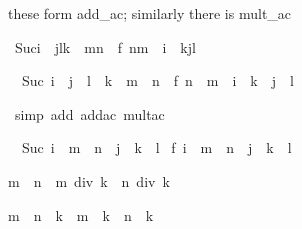 \begin{isabellebody}
\begin{isamarkuptext}
these form add_ac; similarly there is mult_ac%
\end{isamarkuptext}%
\isamarkuptrue%
\isamarkupfalse%
\ {\isachardoublequoteopen}Suc{\isacharparenleft}i\ {\isacharplus}\ j{\isacharasterisk}l{\isacharasterisk}k\ {\isacharplus}\ m{\isacharasterisk}n{\isacharparenright}\ {\isacharequal}\ f\ {\isacharparenleft}n{\isacharasterisk}m\ {\isacharplus}\ i\ {\isacharplus}\ k{\isacharasterisk}j{\isacharasterisk}l{\isacharparenright}{\isachardoublequoteclose}%
\isadelimproof
%
\endisadelimproof
%
\isatagproof
%
\begin{isamarkuptxt}%
\begin{isabelle}%
\ {}{\isachardot}\ Suc\ {\isacharparenleft}i\ {\isacharplus}\ j\ {\isacharasterisk}\ l\ {\isacharasterisk}\ k\ {\isacharplus}\ m\ {\isacharasterisk}\ n{\isacharparenright}\ {\isacharequal}\ f\ {\isacharparenleft}n\ {\isacharasterisk}\ m\ {\isacharplus}\ i\ {\isacharplus}\ k\ {\isacharasterisk}\ j\ {\isacharasterisk}\ l{\isacharparenright}%
\end{isabelle}%
\end{isamarkuptxt}%
\isamarkuptrue%
\isamarkupfalse%
\ {\isacharparenleft}simp\ add{\isacharcolon}\ add{\isacharunderscore}ac\ mult{\isacharunderscore}ac{\isacharparenright}%
\begin{isamarkuptxt}%
\begin{isabelle}%
\ {}{\isachardot}\ Suc\ {\isacharparenleft}i\ {\isacharplus}\ {\isacharparenleft}m\ {\isacharasterisk}\ n\ {\isacharplus}\ j\ {\isacharasterisk}\ {\isacharparenleft}k\ {\isacharasterisk}\ l{\isacharparenright}{\isacharparenright}{\isacharparenright}\ {\isacharequal}\isanewline
{}f\ {\isacharparenleft}i\ {\isacharplus}\ {\isacharparenleft}m\ {\isacharasterisk}\ n\ {\isacharplus}\ j\ {\isacharasterisk}\ {\isacharparenleft}k\ {\isacharasterisk}\ l{\isacharparenright}{\isacharparenright}{\isacharparenright}%
\end{isabelle}%
\end{isamarkuptxt}%
\isamarkuptrue%
\isamarkupfalse%
%
\endisatagproof
{\isafoldproof}%
%
\isadelimproof
%
\endisadelimproof
%
\begin{isamarkuptext}%
\begin{isabelle}%
m\ {\isasymle}\ n\ {\isasymLongrightarrow}\ m\ div\ k\ {\isasymle}\ n\ div\ k%
\end{isabelle}

\begin{isabelle}%
{\isacharparenleft}m\ {\isacharminus}\ n{\isacharparenright}\ {\isacharasterisk}\ k\ {\isacharequal}\ m\ {\isacharasterisk}\ k\ {\isacharminus}\ n\ {\isacharasterisk}\ k%
\end{isabelle}


\end{isamarkuptext}
\end{isabellebody}
